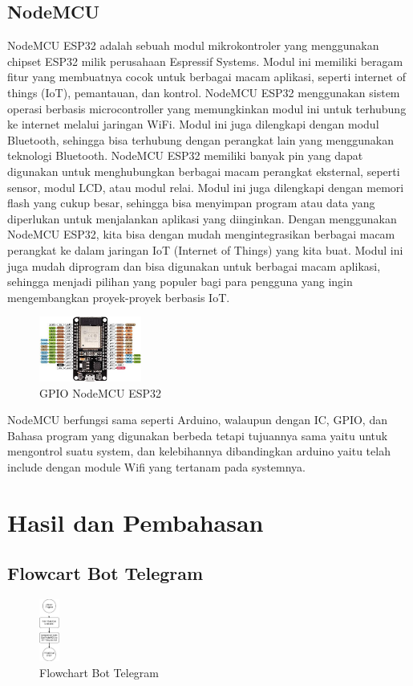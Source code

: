\documentclass[conference]{IEEEtran}
\begin{document}
\subsection{NodeMCU}
\vspace{0.2cm}
NodeMCU ESP32 adalah sebuah modul mikrokontroler yang menggunakan chipset ESP32 milik perusahaan Espressif Systems. Modul ini memiliki beragam fitur yang membuatnya cocok untuk berbagai macam aplikasi, seperti internet of things (IoT), pemantauan, dan kontrol.
NodeMCU ESP32 menggunakan sistem operasi berbasis microcontroller yang memungkinkan modul ini untuk terhubung ke internet melalui jaringan WiFi. Modul ini juga dilengkapi dengan modul Bluetooth, sehingga bisa terhubung dengan perangkat lain yang menggunakan teknologi Bluetooth.
NodeMCU ESP32 memiliki banyak pin yang dapat digunakan untuk menghubungkan berbagai macam perangkat eksternal, seperti sensor, modul LCD, atau modul relai. Modul ini juga dilengkapi dengan memori flash yang cukup besar, sehingga bisa menyimpan program atau data yang diperlukan untuk menjalankan aplikasi yang diinginkan.
Dengan menggunakan NodeMCU ESP32, kita bisa dengan mudah mengintegrasikan berbagai macam perangkat ke dalam jaringan IoT (Internet of Things) yang kita buat. Modul ini juga mudah diprogram dan bisa digunakan untuk berbagai macam aplikasi, sehingga menjadi pilihan yang populer bagi para pengguna yang ingin mengembangkan proyek-proyek berbasis IoT.
\begin{figure}[h]
        \centering
        \includegraphics[width=0.3\textwidth]{nodemcu.jpg}
        \caption{GPIO NodeMCU ESP32}
\end{figure}
    NodeMCU berfungsi sama seperti Arduino, walaupun dengan IC, GPIO, dan Bahasa program yang digunakan berbeda tetapi tujuannya sama yaitu untuk mengontrol suatu system, dan kelebihannya dibandingkan arduino yaitu telah include dengan module Wifi yang tertanam pada systemnya.


    \section{Hasil dan Pembahasan}
    \subsection{Flowcart Bot Telegram}
    \begin{figure}[h]
        \centering
        \includegraphics[width=0.06\textwidth]{telegrambot.png}
        \caption{Flowchart Bot Telegram}
    \end{figure}
    \vspace{2cm}
    
\end{document}
